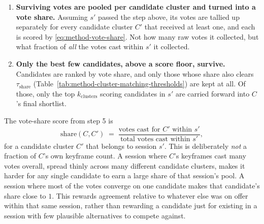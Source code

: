 \begin{enumerate}
    further, no matter how high any individual one's score would otherwise have been. This
    check looks only at how many of $C$'s keyframes engaged with $s'$ at all, not at which
    specific candidate cluster they voted for.
  \item \textbf{Surviving votes are pooled per candidate cluster and turned into a vote
    share.} Assuming $s'$ passed the step above, its votes are tallied up separately for every
    candidate cluster $C'$ that received at least one, and each is scored by
    \eqref{eq:method-vote-share}. Not how many raw votes it collected, but what fraction of
    \emph{all} the votes cast within $s'$ it collected.
  \item \textbf{Only the best few candidates, above a score floor, survive.} Candidates are
    ranked by vote share, and only those whose share also clears $\tau_{\mathrm{share}}$
    (Table~\ref{tab:method-cluster-matching-thresholds}) are kept at all. Of those, only the
    top $k_{\mathrm{clusters}}$ scoring candidates in $s'$ are carried forward into $C$'s
    final shortlist.
\end{enumerate}

The vote-share score from step 5 is
\begin{equation}
  \label{eq:method-vote-share}
  \mathrm{share}(C, C') \;=\; \frac{\text{votes cast for } C' \text{ within } s'}
  {\text{total votes cast within } s'},
\end{equation}
for a candidate cluster $C'$ that belongs to session $s'$. This is deliberately \emph{not} a
fraction of $C$'s own keyframe count. A session where $C$'s keyframes cast many votes overall,
spread thinly across many different candidate clusters, makes it harder for any single
candidate to earn a large share of that session's pool. A session where most of the votes
converge on one candidate makes that candidate's share close to $1$. This rewards agreement
relative to whatever else was on offer within that same session, rather than rewarding a
candidate just for existing in a session with few plausible alternatives to compete against.


